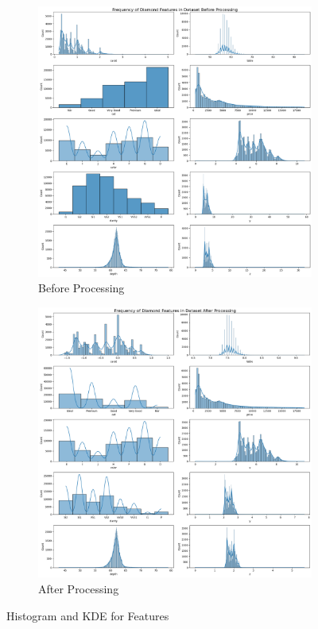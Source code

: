 \documentclass[11pt,letterpaper]{article}
\begin{document}
\begin{figure}[H]
    \centering
    \begin{subfigure}[b]{0.45\textwidth}
        \centering
        \includegraphics[width=\textwidth]{../Figures/Question-1/featureprehist.png}
        \caption{Before Processing}
        \label{fig:clarityBox}
    \end{subfigure}
    \hfill
    \begin{subfigure}[b]{0.45\textwidth}
        \centering
        \includegraphics[width=\textwidth]{../Figures/Question-1/featureposthist.png}
        \caption{After Processing}
        \label{fig:colorBox}
    \end{subfigure}
       \caption{Histogram and KDE for Features}
       \label{fig:boxPlots}
\end{figure}
\end{document}
